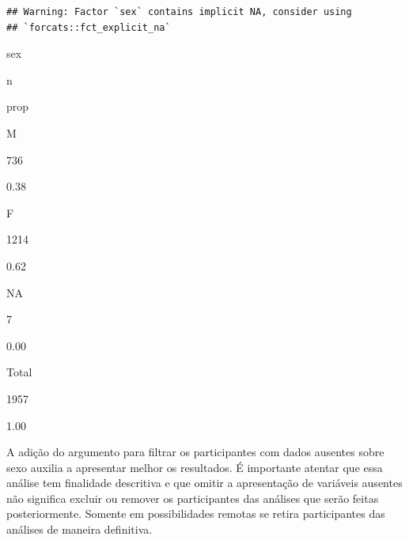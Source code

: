 \documentclass[
]{book}
\newenvironment{Shaded}{\begin{snugshade}}{\end{snugshade}}
\newcommand{\DataTypeTok}[1]{\textcolor[rgb]{0.13,0.29,0.53}{#1}}
\newcommand{\DecValTok}[1]{\textcolor[rgb]{0.00,0.00,0.81}{#1}}
\newcommand{\KeywordTok}[1]{\textcolor[rgb]{0.13,0.29,0.53}{\textbf{#1}}}
\newcommand{\NormalTok}[1]{#1}
\newcommand{\OperatorTok}[1]{\textcolor[rgb]{0.81,0.36,0.00}{\textbf{#1}}}
\newcommand{\StringTok}[1]{\textcolor[rgb]{0.31,0.60,0.02}{#1}}
\begin{document}
\begin{Shaded}
\end{Shaded}

\begin{verbatim}
## Warning: Factor `sex` contains implicit NA, consider using
## `forcats::fct_explicit_na`
\end{verbatim}

sex

n

prop

M

736

0.38

F

1214

0.62

NA

7

0.00

Total

1957

1.00

A adição do argumento para filtrar os participantes com dados ausentes sobre sexo auxilia a apresentar melhor os resultados. É importante atentar que essa análise tem finalidade descritiva e que omitir a apresentação de variáveis ausentes não significa excluir ou remover os participantes das análises que serão feitas posteriormente. Somente em possibilidades remotas se retira participantes das análises de maneira definitiva.
\end{document}

